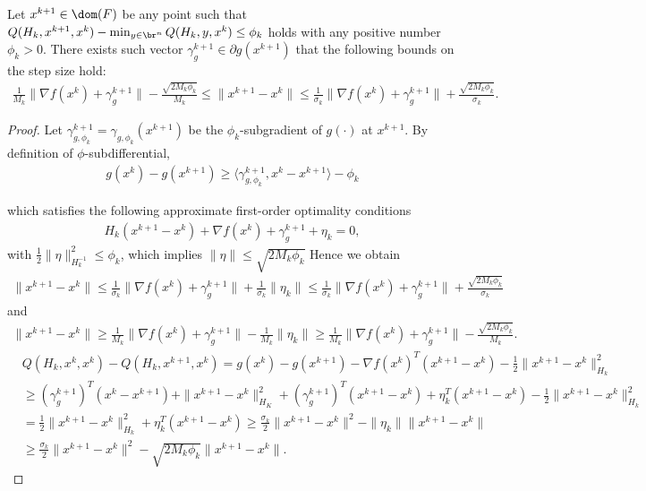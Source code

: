\documentclass[11pt]{article}
\numberwithin{equation}{section}
\begin{document}
\begin{lemma}\label{lem:bound_step_size_inexact}
Let $x^{k+1} \in \dom(F)$ be any point such that $Q(H_k, x^{k+1},x^k)-\min_{y\in\br^n} Q(H_k, y,x^k)\leq \phi_k$ holds with any positive number $\phi_k > 0$. There exists such vector $\gamma_g^{k+1} \in \partial g(x^{k+1})$ that the following bounds on the step size hold: 
\begin{align}
    \label{equ:bound_step_size_inexact}
    \frac{1}{M_k}\|  \nabla f(x^k) + \gamma_g^{k+1} \|- \frac{\sqrt{2M_k\phi_k}}{M_k} 
    \leq 
    \|x^{k+1} - x^k\| 
    \leq 
    \frac{1}{\sigma_k}\|  \nabla f(x^k) + \gamma_g^{k+1} \| + \frac{\sqrt{2M_k\phi_k}}{\sigma_k}.
\end{align}
\end{lemma}
\begin{proof}
	Let $\gamma_{g, \phi_k}^{k+1}=\gamma_{g, \phi_k}(x^{k+1})$ be the $\phi_k$-subgradient of $g(\cdot)$ at $x^{k+1}$. By definition of $\phi$-subdifferential, 
	\begin{align}
        \label{equ:_g_phi_subgradient}
        g(x^k) - g(x^{k+1}) 
        \geq 
        \langle \gamma_{g, \phi_k}^{k+1}, x^k-x^{k+1} \rangle - \phi_k
    \end{align}


	which satisfies the following approximate first-order optimality conditions 
    \begin{align}
        \label{equ:bound_Q_Qstar_1st_optima}
        H_k(x^{k+1}-x^k) + \nabla f(x^k) + \gamma_g^{k+1}+\eta_k= 0,
    \end{align}
    with $\frac{1}{2}\|\eta\|^2_{H_k^{-1}}\leq \phi_k$, which implies $\|\eta\| \leq \sqrt{2M_k\phi_k}$
   Hence we obtain
    \begin{align*}
       \| x^{k+1} - x^k\|
        \leq  \frac{1}{\sigma_k}\|  \nabla f(x^k) + \gamma_g^{k+1} \| + \frac{1}{\sigma_k}\|\eta_k\|
        \leq  
        \frac{1}{\sigma_k}\|  \nabla f(x^k) + \gamma_g^{k+1} \| + \frac{\sqrt{2M_k\phi_k}}{\sigma_k}
	\end{align*}
	and
	\begin{align*}
       	\| x^{k+1} - x^k\|
        \geq   \frac{1}{M_k}\|  \nabla f(x^k) + \gamma_g^{k+1} \|-   \frac{1}{M_k}\|\eta_k\|
         \geq   
         \frac{1}{M_k}\|  \nabla f(x^k) + \gamma_g^{k+1} \|- \frac{\sqrt{2M_k\phi_k}}{M_k}.
	\end{align*}
	\begin{align}
	        &Q(H_k,x^k,x^k) - Q(H_k,x^{k+1}, x^k)
	        = g(x^k) - g(x^{k+1}) -  \nabla f(x^k)^T( x^{k+1}-x^k)  - \frac{1}{2}\|x^{k+1}-x^k\|^2_{H_k} \nonumber \\
	        \nonumber&\geq ( \gamma_g^{k+1})^T( x^{k}-x^{k+1} ) + \|x^{k+1}-x^k\|_{H_K}^2 +  (\gamma_g^{k+1})^T( x^{k+1}-x^k )+ \eta_k^T( x^{k+1}-x^k ) - \frac{1}{2}\|x^{k+1}-x^k\|^2_{H_k} \\
	          \label{eq:lowerbndinexact}
	&= \frac{1}{2}\|x^{k+1}-x^k\|^2_{H_k} + \eta_k^T( x^{k+1}-x^k )\geq \frac{\sigma_k}{2}\|x^{k+1}-x^k\|^2-
	        \|\eta_k\|\|x^{k+1}-x^k\|  \\
	        \nonumber &\geq \frac{\sigma_k}{2}\|x^{k+1}-x^k\|^2-\sqrt{2M_k\phi_k}\|x^{k+1}-x^k\|.
	\end{align}
\end{proof}
\end{document}
